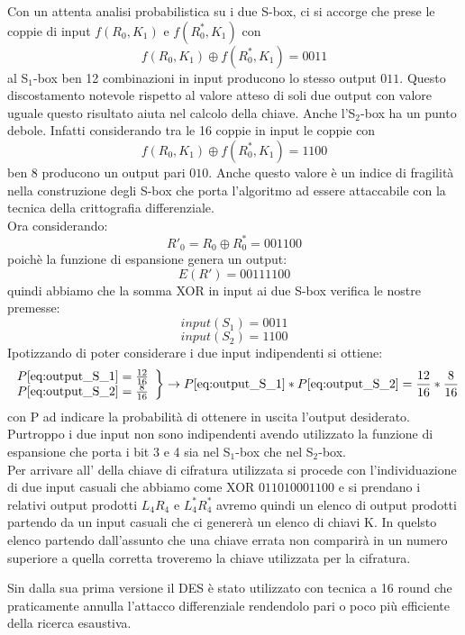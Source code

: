 \documentclass[11pt, a4paper, oneside]{Thesis} %
\begin{document}
Con un attenta analisi probabilistica su i due S-box, ci si accorge che prese le coppie di input $f(R_0,K_1)$ e $f(R^*_0,K_1)$ con
\[f(R_0,K_1) \oplus f(R^*_0,K_1)=0011\]
al S$_1$-box ben 12 combinazioni in input producono lo stesso output $011$. Questo discostamento notevole rispetto al valore atteso di soli due output 
con valore uguale questo risultato aiuta nel calcolo della chiave.
Anche l'S$_2$-box ha un punto debole. Infatti considerando tra le 16 coppie in input le coppie con 
\[f(R_0,K_1) \oplus f(R^*_0,K_1)=1100\]
ben 8 producono un output pari $010$. Anche questo valore è un indice di fragilità nella construzione degli S-box che porta l'algoritmo ad essere attaccabile con la tecnica 
della crittografia differenziale.
\\Ora considerando:
\[R'_0 = R_0 \oplus R^*_0 = 001100\]
poichè la funzione di espansione genera un output:
\[ E(R') = 00111100\]
quindi abbiamo che la somma XOR in input ai due S-box verifica le nostre premesse:
\begin{equation}
  \label{eq:output_S_1} input(S_1)=0011 
\end{equation}
\begin{equation}
  \label{eq:output_S_2} input(S_2)=1100 
\end{equation}
Ipotizzando di poter considerare i due input indipendenti si ottiene:
\[\left .
    \begin{array}{l l}
      P\eqref{eq:output_S_1}={12 \over 16}\\
      P\eqref{eq:output_S_2} = {8 \over 16}
    \end{array}
  \right \} \to P\eqref{eq:output_S_1}*P\eqref{eq:output_S_2}={12 \over 16}*{8 \over 16}\]
con P ad indicare la probabilità di ottenere in uscita l'output desiderato. 
\\Purtroppo i due input non sono indipendenti avendo utilizzato la funzione di espansione che porta i bit 3 e 4 sia nel S$_1$-box che nel S$_2$-box. 
\\Per arrivare all' della chiave di cifratura utilizzata si procede con l'individuazione di due input casuali che abbiamo come XOR $011010001100$ e si prendano i relativi 
output prodotti $L_4R_4$ e $L^*_4R^*_4$ avremo quindi un elenco di output prodotti partendo da un input casuali che ci genererà un elenco di chiavi K. In quelsto elenco partendo dall'assunto
che una chiave errata non comparirà in un numero superiore a quella corretta troveremo la chiave utilizzata per la cifratura.
\par Sin dalla sua prima versione il DES è stato utilizzato con tecnica a 16 round che praticamente annulla l'attacco differenziale rendendolo pari o poco più efficiente
della ricerca esaustiva.
\end{document}
